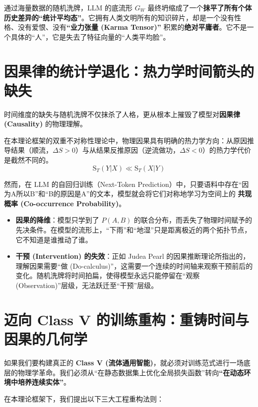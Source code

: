 通过海量数据的随机洗牌，LLM 的底流形 $G_W$ 最终坍缩成了一个\textbf{抹平了所有个体历史差异的“统计平均态”}。它拥有人类文明所有的知识碎片，却是一个没有性格、没有爱恨、没有\textbf{“业力张量 (Karma Tensor)”} 积累的\textbf{绝对平庸者}。它不是一个具体的“人”，它是失去了特征向量的“人类平均脸”。

\section{因果律的统计学退化：热力学时间箭头的缺失}
\label{sec:degeneration_of_causality}

时间维度的缺失与随机洗牌不仅抹杀了人格，更从根本上摧毁了模型对\textbf{因果律 (Causality)} 的物理理解。


在本理论框架的双重不对称性理论中，物理因果具有明确的热力学方向：从原因推导结果（顺流，$\Delta S > 0$）与从结果反推原因（逆流做功，$\Delta S < 0$）的热力学代价是截然不同的。
$$ \mathrm{S}_T(Y | X) \ll \mathrm{S}_T(X | Y) $$

然而，在 LLM 的自回归训练（Next-Token Prediction）中，只要语料中存在“因为A所以B”和“B的原因是A”的文本，模型就会将它们对称地学习为空间上的 \textbf{共现概率 (Co-occurrence Probability)}。

\begin{itemize}
    \item \textbf{因果的降维}：模型只学到了 $P(A, B)$ 的联合分布，而丢失了物理时间赋予的先决条件。在模型的流形上，“下雨”和“地湿”只是距离极近的两个拓扑节点，它不知道是谁推动了谁。
    \item \textbf{干预 (Intervention) 的失效}：正如 Judea Pearl 的因果推断理论所指出的，理解因果需要“做 (Do-calculus)”，这需要一个连续的时间轴来观察干预前后的变化。随机洗牌将时间拍扁，使得模型永远只能停留在“观察 (Observation)”层级，无法跃迁至“干预”层级。
\end{itemize}

\section{迈向 Class V 的训练重构：重铸时间与因果的几何学}
\label{sec:reconstructing_training_for_class_v}

如果我们要构建真正的 \textbf{Class V (流体通用智能)}，就必须对训练范式进行一场底层的物理学革命。我们必须从“在静态数据集上优化全局损失函数”转向\textbf{“在动态环境中培养连续实体”}。

在本理论框架下，我们提出以下三大工程重构法则：

